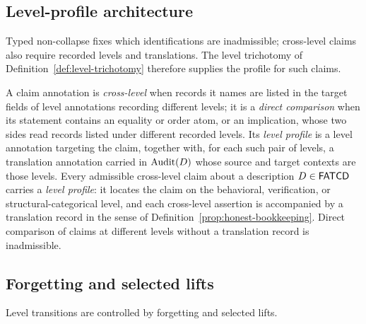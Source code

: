 \subsection{Level-profile architecture}\label{subsec:level-profile-architecture}

Typed non-collapse fixes which identifications are inadmissible; cross-level
claims also require recorded levels and translations. The level trichotomy of
Definition~\ref{def:level-trichotomy} therefore supplies the profile for such
claims.

\begin{definition}\label{prop:level-profile}
A claim annotation is \emph{cross-level} when records it names are listed in the target fields of level annotations recording different levels; it is a \emph{direct comparison} when
its statement contains an equality or order atom, or an implication, whose two sides read records listed under different recorded levels.
Its \emph{level profile} is a level annotation targeting the claim, together
with, for each such pair of levels, a translation annotation carried in
\(\operatorname{Audit}\!\left(D\right)\) whose source and target contexts are those levels.
Every admissible cross-level claim about a description \(D \in \mathsf{FATCD}{}\) carries a
\emph{level profile}: it locates the claim on the behavioral,
verification, or structural-categorical level, and each cross-level
assertion is accompanied by a translation record in the sense of
Definition~\ref{prop:honest-bookkeeping}. Direct comparison of claims at
different levels without a translation record is inadmissible.
\end{definition}

\subsection{Forgetting and selected lifts}\label{subsec:forgetting-lifts}

Level transitions are controlled by forgetting and selected lifts.

